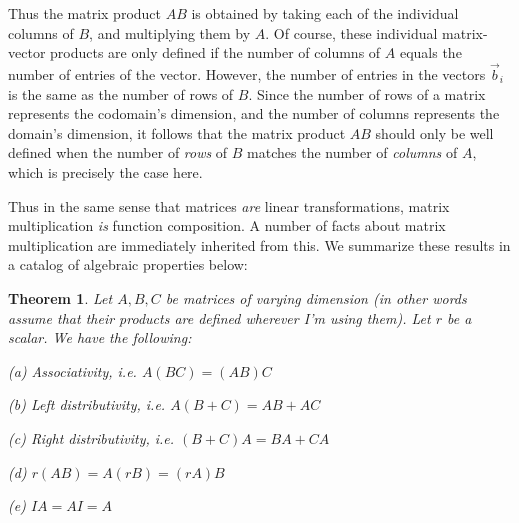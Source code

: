 \documentclass{article}
\theoremstyle{definition}
\theoremstyle{plain}
\theoremstyle{theorem}
\newtheorem{theorem}{Theorem}[section]
\begin{document}
Thus the matrix product $AB$ is obtained by taking each of the individual columns of $B$, and multiplying them by $A$. Of course, these individual matrix-vector products are only defined if the number of columns of $A$ equals the number of entries of the vector. However, the number of entries in the vectors $\vec{b}_i$ is the same as the number of rows of $B$. Since the number of rows of a matrix represents the codomain's dimension, and the number of columns represents the domain's dimension, it follows that the matrix product $AB$ should only be well defined when the number of \textit{rows} of $B$ matches the number of \textit{columns} of $A$, which is precisely the case here. 
\par Thus in the same sense that matrices \textit{are} linear transformations, matrix multiplication \textit{is} function composition. A number of facts about matrix multiplication are immediately inherited from this. We summarize these results in a catalog of algebraic properties below:
\begin{theorem}
	Let $A,B,C$ be matrices of varying dimension (in other words assume that their products are defined wherever I'm using them). Let $r$ be a scalar. We have the following:
	\item[(a)] Associativity, i.e. $A(BC) = (AB)C$
	\item[(b)] Left distributivity, i.e. $A(B+C) = AB+AC$
	\item[(c)] Right distributivity, i.e. $(B+C)A = BA+CA$
	\item[(d)] $r(AB) = A(rB) = (rA)B$
	\item[(e)] $IA = AI = A$
\end{theorem}
\end{document}
